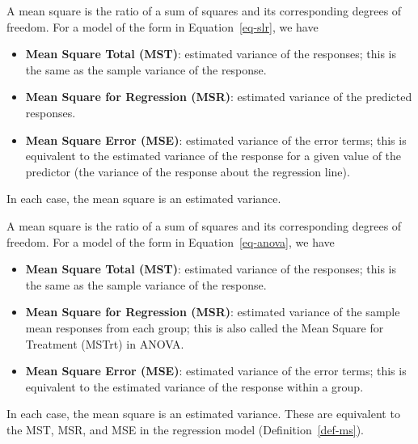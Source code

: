 \documentclass[
  letterpaper,
  DIV=11,
  numbers=noendperiod]{scrreprt}
\providecommand{\tightlist}{%
  \setlength{\itemsep}{0pt}\setlength{\parskip}{0pt}}\usepackage{longtable,booktabs,array}
\theoremstyle{definition}
\theoremstyle{definition}
\theoremstyle{plain}
\theoremstyle{remark}
\begin{document}
\begin{description}
\tightlist
\item[Mean Square (Definition~\ref{def-ms})]
A mean square is the ratio of a sum of squares and its corresponding
degrees of freedom. For a model of the form in Equation~\ref{eq-slr}, we
have
\end{description}

\begin{itemize}
\tightlist
\item
  \textbf{Mean Square Total (MST)}: estimated variance of the responses;
  this is the same as the sample variance of the response.
\item
  \textbf{Mean Square for Regression (MSR)}: estimated variance of the
  predicted responses.
\item
  \textbf{Mean Square Error (MSE)}: estimated variance of the error
  terms; this is equivalent to the estimated variance of the response
  for a given value of the predictor (the variance of the response about
  the regression line).
\end{itemize}

In each case, the mean square is an estimated variance.

\begin{description}
\tightlist
\item[Mean Square (in ANOVA) (Definition~\ref{def-ms-anova})]
A mean square is the ratio of a sum of squares and its corresponding
degrees of freedom. For a model of the form in Equation~\ref{eq-anova},
we have
\end{description}

\begin{itemize}
\tightlist
\item
  \textbf{Mean Square Total (MST)}: estimated variance of the responses;
  this is the same as the sample variance of the response.
\item
  \textbf{Mean Square for Regression (MSR)}: estimated variance of the
  sample mean responses from each group; this is also called the Mean
  Square for Treatment (MSTrt) in ANOVA.
\item
  \textbf{Mean Square Error (MSE)}: estimated variance of the error
  terms; this is equivalent to the estimated variance of the response
  within a group.
\end{itemize}

In each case, the mean square is an estimated variance. These are
equivalent to the MST, MSR, and MSE in the regression model
(Definition~\ref{def-ms}).
\end{document}

